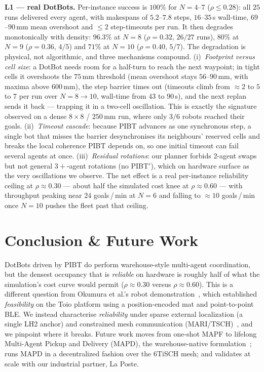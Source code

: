 \textbf{L1 --- real DotBots.}
Per-instance success is $100\%$ for $N=4$--$7$ ($\rho\le0.28$): all $25$ runs delivered
every agent, with makespans of $5.2$--$7.8$ steps, $16$--$35$\,s wall-time, $69$--$90$\,mm
mean overshoot and $\le2$ step-timeouts per run. It then degrades monotonically with
density: $96.3\%$ at $N=8$ ($\rho=0.32$, $26/27$ runs), $80\%$ at $N=9$ ($\rho=0.36$,
$4/5$) and $71\%$ at $N=10$ ($\rho=0.40$, $5/7$). The degradation is physical, not
algorithmic, and three mechanisms compound. (i)~\emph{Footprint versus cell size}: a
DotBot needs room for a half-turn to reach the next waypoint; in tight cells it overshoots
the $75$\,mm threshold (mean overshoot stays $56$--$90$\,mm, with maxima above $600$\,mm),
the step barrier times out (timeouts climb from $\approx2$ to $5$ to $7$ per run over
$N=8\!\to\!10$, wall-time from $43$ to $90$\,s), and the next replan sends it back ---
trapping it in a two-cell oscillation. This is exactly the signature observed on a dense
$8\times8$ / $250$\,mm run, where only $3/6$ robots reached their goals. (ii)~\emph{Timeout
cascade}: because PIBT advances as one synchronous step, a single bot that misses the
barrier desynchronises its neighbours' reserved cells and breaks the local coherence PIBT
depends on, so one initial timeout can fail several agents at once. (iii)~\emph{Residual
rotations}: our planner forbids 2-agent swaps but not general $3{+}$-agent rotations (no
PIBT$'$), which on hardware surface as the very oscillations we observe. The net effect is
a real per-instance reliability ceiling at $\rho\approx0.30$ --- about half the simulated
cost knee at $\rho\approx0.60$ --- with throughput peaking near $24$ goals\,/\,min at
$N=6$ and falling to $\approx10$ goals\,/\,min once $N=10$ pushes the fleet past that
ceiling.

\section{Conclusion \& Future Work}
\label{sec:conclusion}
DotBots driven by PIBT do perform warehouse-style multi-agent coordination, but the
densest occupancy that is \emph{reliable} on hardware is roughly half of what the
simulation's cost curve would permit ($\rho\approx0.30$ versus $\rho\approx0.60$). This is
a different question from Okumura et al.'s robot demonstration~\cite{okumura22priority},
which established \emph{feasibility} on the Toio platform using a position-encoded mat and
point-to-point BLE. We instead characterise \emph{reliability} under sparse external
localization (a single LH2 anchor) and constrained mesh communication
(MARI/TSCH)~\cite{alvarado24dotbot}, and we pinpoint where it breaks. Future work moves
from one-shot MAPF to lifelong Multi-Agent Pickup and Delivery (MAPD), the warehouse-native
formulation~\cite{TODO:MAPD}; runs MAPD in a decentralized fashion over the 6TiSCH mesh;%
and validates at scale with our industrial partner, La Poste.

